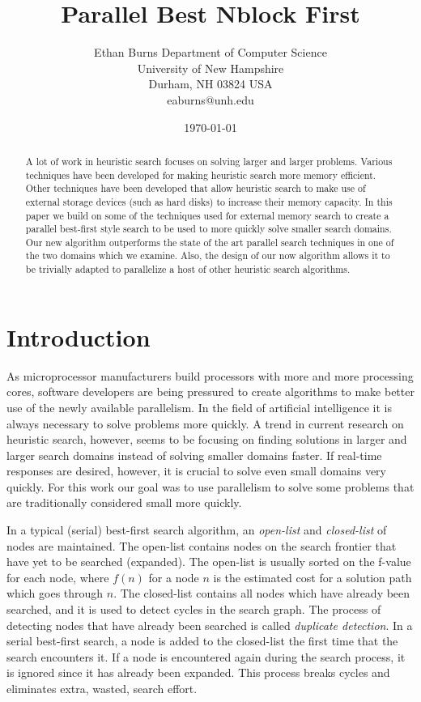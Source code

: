 \documentclass{article}
\title{Parallel Best Nblock First}
\author{Ethan Burns
  Department of Computer Science \\
  University of New Hampshire \\
  Durham, NH 03824 USA \\
  eaburns@unh.edu}
\date{\today}
\begin{document}
\maketitle

\begin{abstract}
  A lot of work in heuristic search focuses on solving larger and
  larger problems.  Various techniques have been developed for making
  heuristic search more memory efficient.  Other techniques have been
  developed that allow heuristic search to make use of external
  storage devices (such as hard disks) to increase their memory
  capacity.  In this paper we build on some of the techniques used for
  external memory search to create a parallel best-first style search
  to be used to more quickly solve smaller search domains.  Our new
  algorithm outperforms the state of the art parallel search
  techniques in one of the two domains which we examine.  Also, the
  design of our now algorithm allows it to be trivially adapted to
  parallelize a host of other heuristic search algorithms.
\end{abstract}

\section{Introduction}

As microprocessor manufacturers build processors with more and more
processing cores, software developers are being pressured to create
algorithms to make better use of the newly available parallelism.  In
the field of artificial intelligence it is always necessary to solve
problems more quickly.  A trend in current research on heuristic
search, however, seems to be focusing on finding solutions in larger
and larger search domains instead of solving smaller domains faster.
If real-time responses are desired, however, it is crucial to solve
even small domains very quickly.  For this work our goal was to use
parallelism to solve some problems that are traditionally considered
small more quickly.

In a typical (serial) best-first search algorithm, an \emph{open-list}
and \emph{closed-list} of nodes are maintained.  The open-list
contains nodes on the search frontier that have yet to be searched
(expanded).  The open-list is usually sorted on the f-value for each
node, where $f(n)$ for a node $n$ is the estimated cost for a solution
path which goes through $n$.  The closed-list contains all nodes which
have already been searched, and it is used to detect cycles in the
search graph.  The process of detecting nodes that have already been
searched is called \emph{duplicate detection}.  In a serial best-first
search, a node is added to the closed-list the first time that the
search encounters it.  If a node is encountered again during the
search process, it is ignored since it has already been expanded.
This process breaks cycles and eliminates extra, wasted, search
effort.
\end{document}
